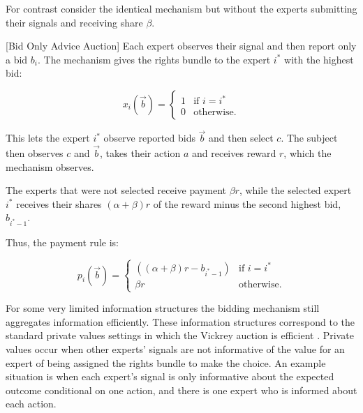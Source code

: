 For contrast consider the identical mechanism but without the experts submitting their signals and receiving share $\beta$. 
 
\begin{mech}\label{mech:BidOnly}[Bid Only Advice Auction]
 	Each expert observes their signal and then report only a bid $b_i$. The mechanism gives the rights bundle to the expert $i^*$ with the highest bid:
 	
 	   $$x_i(\vec{b}) = \begin{cases} 1 & \text{if } i = i^* \\ 0 & \text{otherwise.} \end{cases}$$
	
 	
 	This lets the expert $i^*$ observe reported bids $\vec{b}$ and then select $c$.
 	The subject then observes $c$ and $\vec{b}$, takes their action $a$ and receives reward $r$, which the mechanism observes. 
 	
 	The experts that were not selected receive  payment $\beta r$, while the selected expert $i^*$ receives their shares $(\alpha + \beta) r$ of the reward minus the second highest bid, $b_{i^*-1}$.
 	
 	Thus, the payment rule is:
 	
 	$$p_i(\vec b)= \begin{cases} ((\alpha + \beta)r - b_{i^*-1})& \text{if }i = i^* \\ \beta r & \text{otherwise.} \end{cases}$$

 \end{mech}
 
 For some very limited information structures the bidding mechanism still aggregates information efficiently. 
 These information structures correspond to the standard private values settings in which the Vickrey auction is efficient \citep{vickrey1961}.
 Private values occur when other experts' signals are not informative of the value for an expert of being assigned the rights bundle to make the choice.%
 An example situation is when each expert's signal is only informative about the expected outcome conditional on one action, and  there is one expert who is informed about each action.
 
